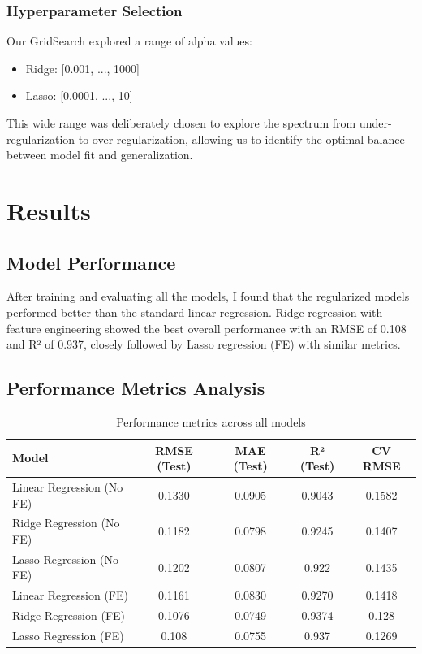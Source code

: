\documentclass{article}
\begin{document}
\subsubsection{Hyperparameter Selection}
Our GridSearch explored a range of alpha values:
\begin{itemize}
    \item Ridge: [0.001, ..., 1000]
    \item Lasso: [0.0001, ..., 10]
\end{itemize}
This wide range was deliberately chosen to explore the spectrum from under-regularization to over-regularization, allowing us to identify the optimal balance between model fit and generalization.

\section{Results}

\subsection{Model Performance}

After training and evaluating all the models, I found that the regularized models performed better than the standard linear regression. Ridge regression with feature engineering showed the best overall performance with an RMSE of 0.108 and R² of 0.937, closely followed by Lasso regression (FE) with similar metrics.

\subsection{Performance Metrics Analysis}

\begin{table}[htbp]
\centering
\begin{tabular}{lcccc}
\toprule
Model & RMSE (Test) & MAE (Test) & R² (Test) & CV RMSE \\
\midrule
Linear Regression (No FE) & 0.1330 & 0.0905 & 0.9043 & 0.1582 \\
Ridge Regression (No FE) & 0.1182 & 0.0798 & 0.9245 & 0.1407 \\
Lasso Regression (No FE) & 0.1202 & 0.0807 & 0.922 & 0.1435 \\
Linear Regression (FE) & 0.1161 & 0.0830 & 0.9270 & 0.1418 \\
Ridge Regression (FE) & 0.1076 & 0.0749 & 0.9374 & 0.128 \\
Lasso Regression (FE) & 0.108 & 0.0755 & 0.937 & 0.1269 \\
\bottomrule
\end{tabular}
\caption{Performance metrics across all models}
\end{table}
\end{document}
